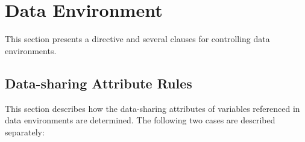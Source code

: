 %
%
%
%
%
%
%
%
%
%
%
%
%


\section{Data Environment}
\label{sec:Data Environment}
This section presents a directive and several clauses for controlling data environments.

\subsection{Data-sharing Attribute Rules}
\label{subsec:Data-sharing Attribute Rules}
This section describes how the data-sharing attributes of variables referenced in
data environments are determined.
The following two cases are described separately:


